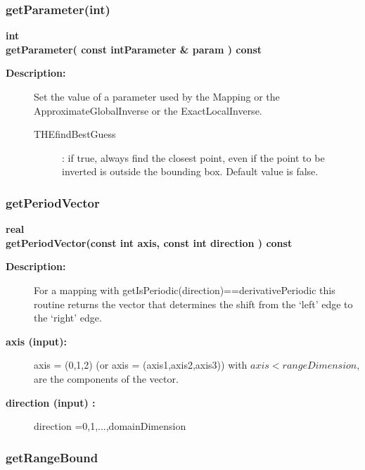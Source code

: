 \subsubsection{getParameter(int)}
 
\begin{flushleft} \textbf{%
int  \\ 
\settowidth{\MappingIncludeArgIndent}{getParameter(}%
getParameter( const  intParameter \& param ) const
}\end{flushleft}
\begin{description}
\item[{\bf Description:}] 
   Set the value of a parameter used by the Mapping or the ApproximateGlobalInverse or the ExactLocalInverse.
 
 \begin{description}
  \item[THEfindBestGuess] : if true, always find the closest point, even if the point to be inverted
    is outside the bounding box. Default value is false.
 \end{description}

 
\end{description}
\subsubsection{getPeriodVector}
 
\begin{flushleft} \textbf{%
real  \\ 
\settowidth{\MappingIncludeArgIndent}{getPeriodVector(}%
getPeriodVector(const int axis, const int direction ) const
}\end{flushleft}
\begin{description}
\item[{\bf Description:}] 
  For a mapping with getIsPeriodic(direction)==derivativePeriodic this routine returns
 the vector that determines the shift from the `left' edge to the `right' edge.
\item[{\bf axis (input):}]  axis = (0,1,2) (or axis = (axis1,axis2,axis3)) with $axis<rangeDimension$, 
     are the components of the vector.
\item[{\bf direction (input) :}]  direction =0,1,...,domainDimension
\end{description}
\subsubsection{getRangeBound}
 
